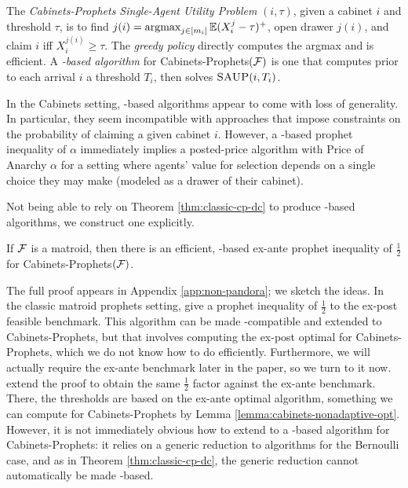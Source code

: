\begin{definition} \label{def:csaup}
	The \emph{Cabinets-Prophets Single-Agent Utility Problem} \SAUP$(i,\tau)$, given a cabinet $i$ and threshold $\tau$, is to find $j(i) = \operatorname*{argmax}_{j \in [m_i]} \operatorname*{\mathbb{E}} (X_i^j - \tau)^+$, open drawer $j(i)$, and claim $i$ iff $X_i^{j(i)} \geq \tau$.
	The \emph{greedy policy} directly computes the argmax and is efficient.
	A \emph{\SAUP{}-based algorithm} for Cabinets-Prophets$(\mathcal{F})$ is one that computes prior to each arrival $i$ a threshold $T_i$, then solves $\textsc{SAUP}{}(i,T_i)$.
\end{definition}

In the Cabinets setting, \SAUP{}-based algorithms appear to come with loss of generality.
In particular, they seem incompatible with approaches that impose constraints on the probability of claiming a given cabinet $i$.
However, a \SAUP{}-based prophet inequality of $\alpha$ immediately implies a posted-price algorithm with Price of Anarchy $\alpha$ for a setting where agents' value for selection depends on a single choice they may make (modeled as a drawer of their cabinet).

Not being able to rely on Theorem \ref{thm:classic-cp-dc} to produce \SAUP{}-based algorithms, we construct one explicitly.

\begin{theorem} \label{thm:classic-cp-saup}
  If $\mathcal{F}$ is a matroid, then there is an efficient, \SAUP-based ex-ante prophet inequality of $\frac{1}{2}$ for Cabinets-Prophets$(\mathcal{F})$.
\end{theorem}
The full proof appears in Appendix \ref{app:non-pandora}; we sketch the ideas.
In the classic matroid prophets setting, \citet{kleinberg2012matroid} give a prophet inequality of $\frac{1}{2}$ to the ex-post feasible benchmark.
This algorithm can be made \SAUP-compatible and extended to Cabinets-Prophets, but that involves computing the ex-post optimal for Cabinets-Prophets, which we do not know how to do efficiently.
Furthermore, we will actually require the ex-ante benchmark later in the paper, so we turn to it now.
\citet{lee2018optimal} extend the proof to obtain the same $\frac{1}{2}$ factor against the ex-ante benchmark.
There, the thresholds are based on the ex-ante optimal algorithm, something we can compute for Cabinets-Prophets by Lemma \ref{lemma:cabinets-nonadaptive-opt}.
However, it is not immediately obvious how to extend \citet{lee2018optimal} to a \SAUP-based algorithm for Cabinets-Prophets: it relies on a generic reduction to algorithms for the Bernoulli case, and as in Theorem \ref{thm:classic-cp-dc}, the generic reduction cannot automatically be made \SAUP-based.


